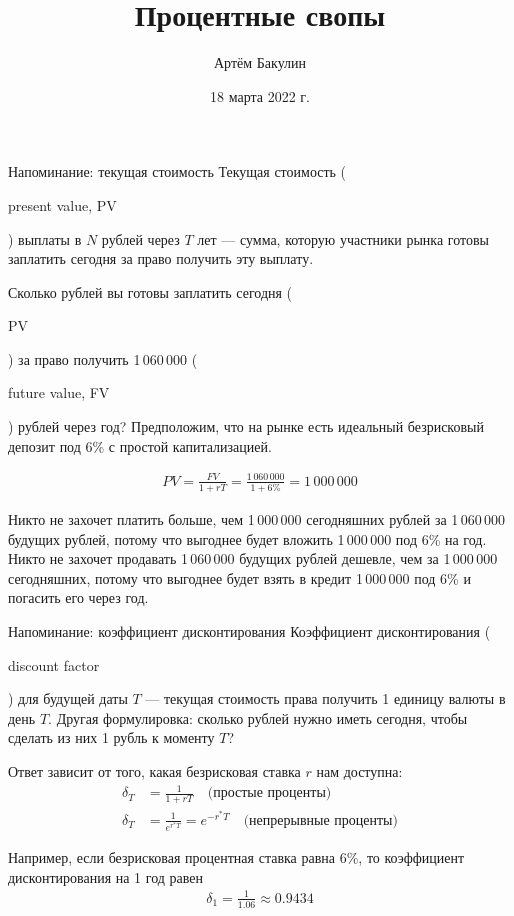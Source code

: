 \documentclass{beamer}
\title{Процентные свопы}
\author{Артём Бакулин}
\date{18 марта 2022 г.}
\newcommand{\en}[1]{\begin{otherlanguage}{english}#1\end{otherlanguage}}
\begin{document}
\begin{frame}
\titlepage
\end{frame}



\begin{frame}{Напоминание: текущая стоимость}
\justify
\alert{Текущая стоимость} (\en{present value, PV}) выплаты в $N$ рублей через $T$ лет --- сумма, 
которую участники рынка готовы заплатить сегодня за право получить эту выплату.

\justify
Сколько рублей вы готовы заплатить сегодня (\en{PV}) за право получить 1\,060\,000 (\en{future value, FV}) рублей через год? Предположим, что на рынке есть идеальный безрисковый депозит под 6\% с простой капитализацией.

\begin{align*}
PV = \frac{FV}{1+rT} = \frac{1\,060\,000}{1 + 6\%} = 1\,000\,000
\end{align*}

\justify
Никто не захочет платить больше, чем 1\,000\,000 сегодняшних рублей за 1\,060\,000 будущих рублей, потому что выгоднее будет вложить 1\,000\,000 под 6\% на год. Никто не захочет продавать 1\,060\,000 будущих рублей дешевле, чем за 1\,000\,000 сегодняшних, потому что выгоднее будет взять в кредит 1\,000\,000 под 6\% и погасить его через год.
\end{frame}



\begin{frame}{Напоминание: коэффициент дисконтирования}
\justify
\alert{Коэффициент дисконтирования} (\en{discount factor}) для будущей даты $T$ --- текущая стоимость права получить 1 единицу валюты в день $T$. Другая формулировка: сколько рублей нужно иметь сегодня, чтобы сделать из них 1 рубль к моменту $T$?

\justify
Ответ зависит от того, какая безрисковая ставка $r$ нам доступна:
\begin{align*}
\delta_T &= \frac{1}{1 + rT} \quad \text{(простые проценты)} \\
\delta_T &= \frac{1}{e^{r^*T}} = e^{-r^*T} \quad \text{(непрерывные проценты)}
\end{align*}

\justify
Например, если безрисковая процентная ставка равна 6\%, то коэффициент дисконтирования на 1 год равен
\begin{align*}
\delta_1 = \frac{1}{1.06} \approx 0.9434
\end{align*}
\end{frame}
\end{document}
